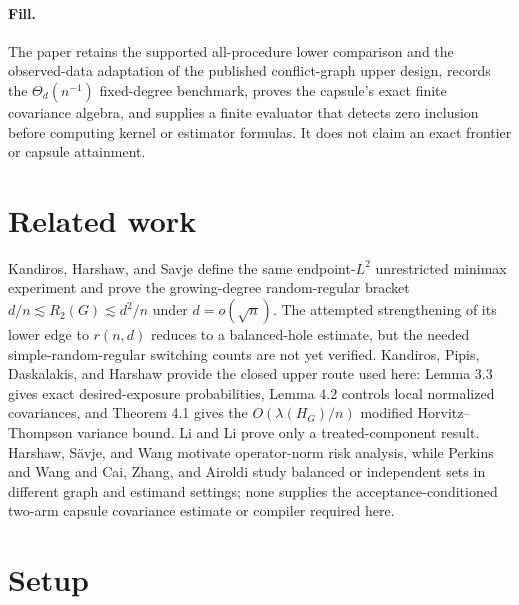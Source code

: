 \documentclass{article}
\begin{document}
\paragraph{Fill.} The paper retains the supported all-procedure lower comparison and the observed-data adaptation of the published conflict-graph upper design, records the \(\Theta_d(n^{-1})\) fixed-degree benchmark, proves the capsule's exact finite covariance algebra, and supplies a finite evaluator that detects zero inclusion before computing kernel or estimator formulas. It does not claim an exact frontier or capsule attainment.

\section{Related work}

Kandiros, Harshaw, and Savje define the same endpoint-\(L^2\) unrestricted minimax experiment and prove the growing-degree random-regular bracket \(d/n\lesssim R_2(G)\lesssim d^2/n\) under \(d=o(\sqrt n)\). The attempted strengthening of its lower edge to \(r(n,d)\) reduces to a balanced-hole estimate, but the needed simple-random-regular switching counts are not yet verified. Kandiros, Pipis, Daskalakis, and Harshaw provide the closed upper route used here: Lemma 3.3 gives exact desired-exposure probabilities, Lemma 4.2 controls local normalized covariances, and Theorem 4.1 gives the \(O(\lambda(H_G)/n)\) modified Horvitz--Thompson variance bound. Li and Li prove only a treated-component result. Harshaw, S\"avje, and Wang motivate operator-norm risk analysis, while Perkins and Wang and Cai, Zhang, and Airoldi study balanced or independent sets in different graph and estimand settings; none supplies the acceptance-conditioned two-arm capsule covariance estimate or compiler required here.

\section{Setup}
\end{document}
